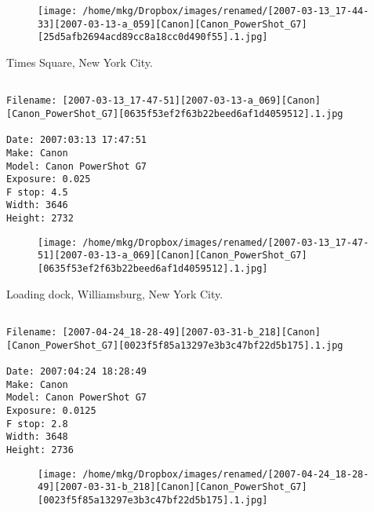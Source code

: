 \begin{figure}
\texttt{[image: /home/mkg/Dropbox/images/renamed/[2007-03-13\_17-44-33][2007-03-13-a\_059][Canon][Canon\_PowerShot\_G7][25d5afb2694acd89cc8a18cc0d490f55].1.jpg]}
\end{figure}
    
\clearpage
\onecolumn
\noindent Times Square, New York City.
\noindent
\begin{lstlisting}

Filename: [2007-03-13_17-47-51][2007-03-13-a_069][Canon][Canon_PowerShot_G7][0635f53ef2f63b22beed6af1d4059512].1.jpg

Date: 2007:03:13 17:47:51
Make: Canon
Model: Canon PowerShot G7
Exposure: 0.025
F stop: 4.5
Width: 3646
Height: 2732
\end{lstlisting}
\clearpage

\begin{figure}
\texttt{[image: /home/mkg/Dropbox/images/renamed/[2007-03-13\_17-47-51][2007-03-13-a\_069][Canon][Canon\_PowerShot\_G7][0635f53ef2f63b22beed6af1d4059512].1.jpg]}
\end{figure}
    
\clearpage
\onecolumn
\noindent Loading dock, Williamsburg, New York City.
\noindent
\begin{lstlisting}

Filename: [2007-04-24_18-28-49][2007-03-31-b_218][Canon][Canon_PowerShot_G7][0023f5f85a13297e3b3c47bf22d5b175].1.jpg

Date: 2007:04:24 18:28:49
Make: Canon
Model: Canon PowerShot G7
Exposure: 0.0125
F stop: 2.8
Width: 3648
Height: 2736
\end{lstlisting}
\clearpage

\begin{figure}
\texttt{[image: /home/mkg/Dropbox/images/renamed/[2007-04-24\_18-28-49][2007-03-31-b\_218][Canon][Canon\_PowerShot\_G7][0023f5f85a13297e3b3c47bf22d5b175].1.jpg]}
\end{figure}
    
